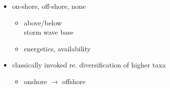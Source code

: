 \documentclass{beamer}
\begin{document}
\begin{frame}
\begin{columns}
\begin{column}{0.5\textwidth}
\begin{center}
        \tiny{}
      \end{center}
    \end{column}
    \begin{column}{0.5\textwidth}
      \begin{itemize}
        \item on-shore, off-shore, none
          \begin{itemize}
            \item above/below \\storm wave base
            \item energetics, availability
          \end{itemize}
        \item classically invoked re. diversification of higher taxa
          \begin{itemize}
            \item onshore \(\to\) offshore
          \end{itemize}
      \end{itemize}
    \end{column}
  \end{columns}
\end{frame}
\end{document}
